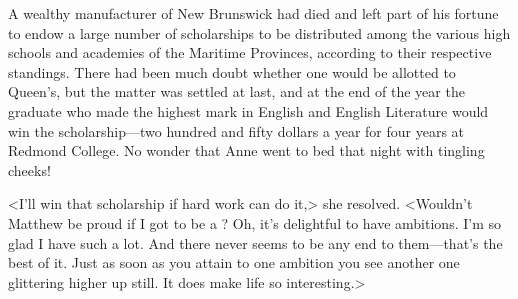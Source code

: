 A wealthy manufacturer of New Brunswick had died and left part of his fortune to endow a large number of scholarships to be distributed among the various high schools and academies of the Maritime Provinces, according to their respective standings. There had been much doubt whether one would be allotted to Queen's, but the matter was settled at last, and at the end of the year the graduate who made the highest mark in English and English Literature would win the scholarship—two hundred and fifty dollars a year for four years at Redmond College. No wonder that Anne went to bed that night with tingling cheeks!

<I'll win that scholarship if hard work can do it,> she resolved. <Wouldn't Matthew be proud if I got to be a ? Oh, it's delightful to have ambitions. I'm so glad I have such a lot. And there never seems to be any end to them—that's the best of it. Just as soon as you attain to one ambition you see another one glittering higher up still. It does make life so interesting.>